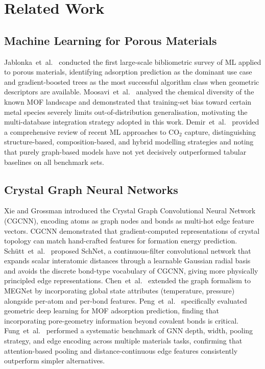 \documentclass[conference]{IEEEtran}
\begin{document}
\section{Related Work}
\label{sec:related}

\subsection{Machine Learning for Porous Materials}

Jablonka~et~al.\ \cite{jablonka2020} conducted the first large-scale
bibliometric survey of ML applied to porous materials, identifying adsorption
prediction as the dominant use case and gradient-boosted trees as the most
successful algorithm class when geometric descriptors are available.
Moosavi~et~al.\ \cite{moosavi2020} analysed the chemical diversity of the
known MOF landscape and demonstrated that training-set bias toward certain
metal species severely limits out-of-distribution generalisation, motivating
the multi-database integration strategy adopted in this work.
Demir~et~al.\ \cite{demir2022} provided a comprehensive review of recent
ML approaches to CO$_2$ capture, distinguishing structure-based, composition-based,
and hybrid modelling strategies and noting that purely graph-based models
have not yet decisively outperformed tabular baselines on all benchmark sets.

\subsection{Crystal Graph Neural Networks}

Xie and Grossman \cite{cgcnn2018} introduced the Crystal Graph Convolutional
Neural Network (CGCNN), encoding atoms as graph nodes and bonds as multi-hot
edge feature vectors.  CGCNN demonstrated that gradient-computed representations
of crystal topology can match hand-crafted features for formation energy
prediction.  Schütt~et~al.\ \cite{schnet2018} proposed SchNet, a continuous-filter
convolutional network that expands scalar interatomic distances through a
learnable Gaussian radial basis and avoids the discrete bond-type vocabulary
of CGCNN, giving more physically principled edge representations.
Chen~et~al.\ \cite{megnet2019} extended the graph formalism to MEGNet by
incorporating global state attributes (temperature, pressure) alongside
per-atom and per-bond features.   Peng~et~al.\ \cite{peng2022} specifically
evaluated geometric deep learning for MOF adsorption prediction, finding that
incorporating pore-geometry information beyond covalent bonds is critical.
Fung~et~al.\ \cite{fung2021} performed a systematic benchmark of GNN depth,
width, pooling strategy, and edge encoding across multiple materials tasks,
confirming that attention-based pooling and distance-continuous edge features
consistently outperform simpler alternatives.
\end{document}
